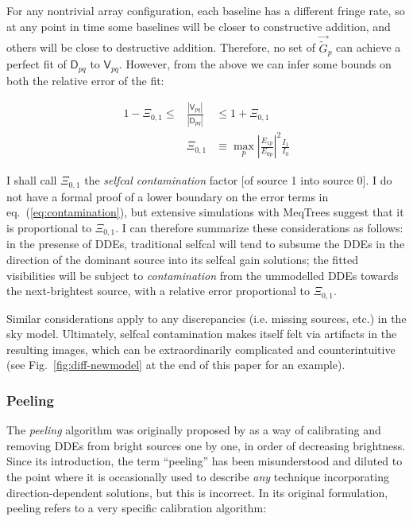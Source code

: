 \documentclass[]{aa}
\newcommand{\jones}[2]{\vec {#1}_{#2}}
\newcommand{\coh}[2]{\mathsf{{#1}}_{{#2}}}
\begin{document}
For any nontrivial array configuration, each baseline has a different fringe rate, so at any point in time some baselines will be closer to constructive addition, and others will be close to destructive addition. Therefore, no set of
$\jones{\tilde G}{p}$ can achieve a perfect fit of $\coh{D}{pq}$ to $\coh{V}{pq}$. However, from the above we can infer some bounds on both the relative error of the fit:

\begin{eqnarray}\label{eq:contamination}
1 -\Xi_{0,1} \le & { \displaystyle \frac{|\coh{V}{pq}|}{|\coh{D}{pq}|} } & \le 1 + \Xi_{0,1} \\
\nonumber & \Xi_{0,1} & \equiv \max_p \left| \frac{E_{1p}}{E_{0p}} \right|^2\frac{I_1}{I_0}
\end{eqnarray}

I shall call $\Xi_{0,1}$ the \emph{selfcal contamination} factor [of source 1 into source 0]. I do not have a formal proof of a lower boundary on the error terms in eq.~(\ref{eq:contamination}), but extensive simulations with MeqTrees suggest that it is proportional to $\Xi_{0,1}$. I can therefore summarize these considerations as follows: in the presense of DDEs, traditional selfcal will tend to subsume the DDEs in the direction of the dominant source into its selfcal gain solutions; the fitted visibilities will be subject to \emph{contamination} from the ummodelled DDEs towards the next-brightest source, with a relative error proportional to $\Xi_{0,1}$.

Similar considerations apply to any discrepancies (i.e. missing sources, etc.) in the sky model. Ultimately, selfcal contamination makes itself felt via artifacts in the resulting images, which can be extraordinarily complicated and counterintuitive (see Fig.~\ref{fig:diff-newmodel} at the end of this paper for an example).

\subsubsection{Peeling\label{sec:peeling}}

The \emph{peeling} algorithm was originally proposed by \citet{JEN:peeling} as a way of calibrating and removing DDEs from bright sources one by one, in order of decreasing brightness. Since its introduction, the term ``peeling'' has been misunderstood and diluted to the point where it is occasionally used to describe {\em any} technique incorporating direction-dependent solutions, but this is incorrect. In its original formulation, peeling refers to a very specific calibration algorithm:
\end{document}
